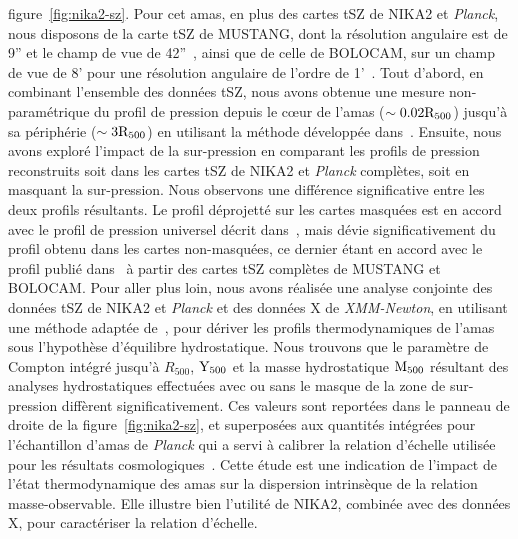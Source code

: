 figure~\ref{fig:nika2-sz}. Pour cet amas, en plus des cartes tSZ de
NIKA2 et \emph{Planck}, nous disposons de la carte tSZ de MUSTANG, dont
la résolution angulaire est de 9'' et le champ de vue de
42''~\citep{Young2015}, ainsi que de celle de BOLOCAM, sur un champ de
vue de 8' pour une résolution angulaire de l'ordre de
1'~\citep{Sayers2013}. Tout d'abord, en combinant l'ensemble des
données tSZ, nous avons obtenue une mesure non-paramétrique du profil
de pression depuis le cœur de l'amas ($\sim 0.02\rm{R}_{500}$)
jusqu'à sa périphérie ($\sim 3\rm{R}_{500}$) en utilisant la méthode
développée dans~\citet{Ruppin2017}. Ensuite, nous avons exploré
l'impact de la sur-pression en comparant les profils de pression
reconstruits soit dans les cartes tSZ de NIKA2 et \emph{Planck}
complètes, soit en masquant la sur-pression. Nous observons une
différence significative entre les deux profils résultants. Le profil
déprojetté sur les cartes masquées est en accord avec le profil de
pression universel décrit dans~\citet{Arnaud2010}, mais dévie
significativement du profil obtenu dans les cartes non-masquées, ce
dernier étant en accord avec le profil publié dans~\citet{Young2015} à
partir des cartes tSZ complètes de MUSTANG et BOLOCAM. 
Pour aller plus loin, nous avons réalisée une analyse conjointe des
données tSZ de NIKA2 et \emph{Planck} et des données X de
\emph{XMM-Newton}, en utilisant une méthode adaptée
de~\citet{Adam2015}, pour dériver les profils thermodynamiques de
l'amas sous l'hypothèse d'équilibre hydrostatique. Nous trouvons que
le paramètre de Compton intégré jusqu'à $R_{500}$, $\rm{Y}_{500}$ et
la masse hydrostatique $\rm{M}_{500}$ résultant des analyses
hydrostatiques effectuées avec ou sans le masque de la zone de
sur-pression diffèrent significativement. Ces valeurs sont reportées
dans le panneau de droite de la figure~\ref{fig:nika2-sz}, et
superposées aux quantités intégrées pour l'échantillon d'amas de
\emph{Planck} qui a servi à calibrer la relation d'échelle utilisée
pour les résultats
cosmologiques~\citep{Planck_2014_SZ_Cosmo,Planck_2016_SZ_cosmo}. Cette
étude est une indication de l'impact de l'état thermodynamique des
amas sur la dispersion intrinsèque de la relation
masse-observable. Elle illustre bien l'utilité de NIKA2, combinée avec
des données X, pour caractériser la relation d'échelle.   






%
%
%
%
%
%
%
%
